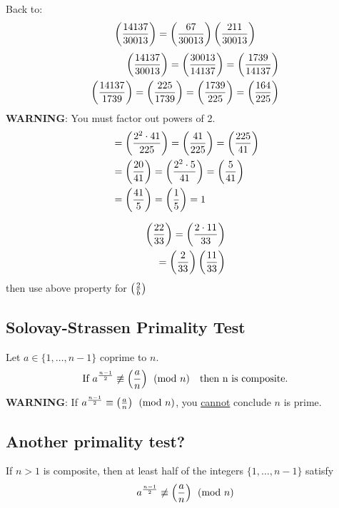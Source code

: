     Back to: 
    \[
        \left( \frac{14137}{30013} \right)  = \left( \frac{67}{30013} \right) \left( \frac{211}{30013} \right) 
    \]
    \begin{align*}
        \left( \frac{14137}{30013} \right)  = \left( \frac{30013}{14137} \right)  = \left( \frac{1739}{14137} \right)   \\
        \left( \frac{14137}{1739} \right)  = \left( \frac{225}{1739} \right)  = \left( \frac{1739}{225} \right)  = \left( \frac{164}{225} \right) 
    \end{align*}
    \textbf{WARNING}: You must factor out powers of 2.
    \begin{align*}
        &= \left( \frac{2^2\cdot 41}{225} \right)  = \left( \frac{41}{225} \right)  = \left( \frac{225}{41} \right)  \\ 
        &= \left( \frac{20}{41} \right)  = \left( \frac{2^2\cdot 5}{41} \right)  = \left( \frac{5}{41} \right)  \\
        &= \left( \frac{41}{5} \right)  = \left( \frac{1}{5} \right)  = 1
    \end{align*}

    \begin{example}
        \begin{align*}
            \left( \frac{22}{33} \right)  = \left( \frac{2\cdot 11}{33} \right)  \\
            = \left( \frac{2}{33} \right) \left( \frac{11}{33} \right) 
        \end{align*}
        then use above property for $\left( \frac{2}{b} \right) $
    \end{example}

    \subsection{Solovay-Strassen Primality Test}
    Let $a\in\{1,\dots,n-1\}$ coprime to $n$. 
    \[
        \text{If } a^{\frac{n-1}{2}} \not\equiv\left( \frac{a}{n} \right) \pmod{n} \quad\text{then n is composite.}
    \]
    \textbf{WARNING}: If $a^{\frac{n-1}{2}}\equiv \left( \frac{a}{n} \right) \pmod{n}$, 
    you \underline{cannot} conclude $n$ is prime. \\
    
    \subsection{Another primality test?}
    \begin{theorem}
        If $n>1$ is composite, then at least half of the integers
        $\{1,\dots,n-1\}$ satisfy 
        \[
            a^{\frac{n-1}{2}} \not\equiv \left( \frac{a}{n} \right) \pmod{n} \\
        \]
    \end{theorem}

